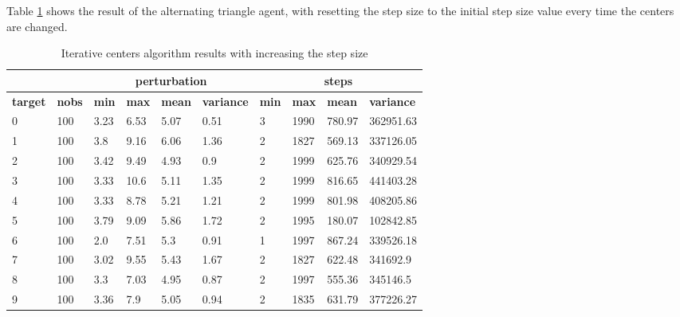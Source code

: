 \documentclass{article}
\begin{document}
Table \ref{tab:iterative_result_new_init} shows the result of the alternating triangle agent, with resetting the step size to the initial step size value every time the centers are changed.

\begin{table}[h]
\caption{Iterative centers algorithm results with increasing the step size}
\label{tab:iterative_result_new_init}
\begin{tabular}{|l|l|l|l|l|l|l|l|l|l|}
\hline
\textbf{}       & \textbf{}     & \multicolumn{4}{c|}{\textbf{perturbation}}                      & \multicolumn{4}{c|}{\textbf{steps}}                             \\ \hline
\textbf{target} & \textbf{nobs} & \textbf{min} & \textbf{max} & \textbf{mean} & \textbf{variance} & \textbf{min} & \textbf{max} & \textbf{mean} & \textbf{variance} \\ \hline
0 & 100  & 3.23     & 6.53     & 5.07      & 0.51          & 3         & 1990      & 780.97     & 362951.63      \\ \hline
1 & 100  & 3.8      & 9.16     & 6.06      & 1.36          & 2         & 1827      & 569.13     & 337126.05      \\ \hline
2 & 100  & 3.42     & 9.49     & 4.93      & 0.9           & 2         & 1999      & 625.76     & 340929.54      \\ \hline
3 & 100  & 3.33     & 10.6     & 5.11      & 1.35          & 2         & 1999      & 816.65     & 441403.28      \\ \hline
4 & 100  & 3.33     & 8.78     & 5.21      & 1.21          & 2         & 1999      & 801.98     & 408205.86      \\ \hline
5 & 100  & 3.79     & 9.09     & 5.86      & 1.72          & 2         & 1995      & 180.07     & 102842.85      \\ \hline
6 & 100  & 2.0      & 7.51     & 5.3       & 0.91          & 1         & 1997      & 867.24     & 339526.18      \\ \hline
7 & 100  & 3.02     & 9.55     & 5.43      & 1.67          & 2         & 1827      & 622.48     & 341692.9       \\ \hline
8 & 100  & 3.3      & 7.03     & 4.95      & 0.87          & 2         & 1997      & 555.36     & 345146.5       \\ \hline
9 & 100  & 3.36     & 7.9      & 5.05      & 0.94          & 2         & 1835      & 631.79     & 377226.27      \\ \hline
\end{tabular}
\end{table}
\end{document}
